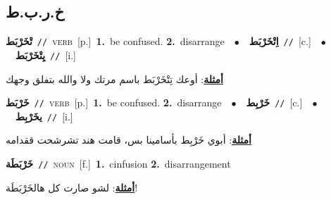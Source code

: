 \documentclass[10pt,a4paper,twoside]{article} %
\begin{document}
\begin{multicols}{2}
\vspace{-3mm}
\subsection*{\color{blue}\foreignlanguage{arabic}{خ.ر.ب.ط}\color{blue}{}} 

{\setlength\topsep{0pt}\textbf{\foreignlanguage{arabic}{تْخَرْبَط}}\ {\color{gray}\texttt{//}\color{black}}\ \textsc{verb}\ [p.]\ \textbf{1.}~be confused.  \textbf{2.}~disarrange\ \ $\bullet$\ \ \setlength\topsep{0pt}\textbf{\foreignlanguage{arabic}{اِتْخَرْبَط}}\ {\color{gray}\texttt{//}\color{black}}\ [c.]\ \ $\bullet$\ \ \setlength\topsep{0pt}\textbf{\foreignlanguage{arabic}{يِتْخَرْبَط}}\ {\color{gray}\texttt{//}\color{black}}\ [i.]\  \begin{flushright}\color{gray}\foreignlanguage{arabic}{\textbf{\underline{\foreignlanguage{arabic}{أمثلة}}}: أوعك تِتْخَرْبَط باسم مرتك ولا والله بتفلق وجهك}\end{flushright}\color{black}} \vspace{2mm}

{\setlength\topsep{0pt}\textbf{\foreignlanguage{arabic}{خَرْبَط}}\ {\color{gray}\texttt{//}\color{black}}\ \textsc{verb}\ [p.]\ \textbf{1.}~be confused.  \textbf{2.}~disarrange\ \ $\bullet$\ \ \setlength\topsep{0pt}\textbf{\foreignlanguage{arabic}{خَرْبِط}}\ {\color{gray}\texttt{//}\color{black}}\ [c.]\ \ $\bullet$\ \ \setlength\topsep{0pt}\textbf{\foreignlanguage{arabic}{يخَرْبِط}}\ {\color{gray}\texttt{//}\color{black}}\ [i.]\  \begin{flushright}\color{gray}\foreignlanguage{arabic}{\textbf{\underline{\foreignlanguage{arabic}{أمثلة}}}: أبوي خَرْبِط بأسامينا بس، قامت هند تشرشحت ققدامه}\end{flushright}\color{black}} \vspace{2mm}

{\setlength\topsep{0pt}\textbf{\foreignlanguage{arabic}{خَرْبَطَة}}\ {\color{gray}\texttt{//}\color{black}}\ \textsc{noun}\ [f.]\ \textbf{1.}~cinfusion  \textbf{2.}~disarrangement\  \begin{flushright}\color{gray}\foreignlanguage{arabic}{\textbf{\underline{\foreignlanguage{arabic}{أمثلة}}}: لشو صارت كل هالخَرْبَطَة!}\end{flushright}\color{black}} \vspace{2mm}


\end{multicols}
\end{document}
